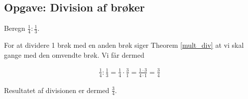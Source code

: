 \subsection{Opgave: Division af brøker}
Beregn $\frac{1}{4}:\frac{1}{3}$.

For at dividere 1 brøk med en anden brøk siger Theorem \ref{mult_div} at vi skal gange med den omvendte brøk. Vi får dermed

\begin{align*}
\frac{1}{4}:\frac{1}{3} = \frac{1}{4} \cdot \frac{3}{1} = \frac{1\cdot 3}{4\cdot 1} = \frac{3}{4}
\end{align*}

Resultatet af divisionen er dermed $\frac{3}{4}$.

